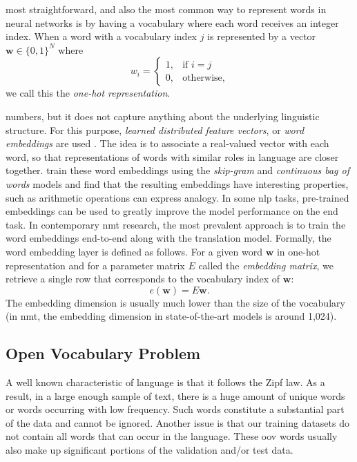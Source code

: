 most straightforward, and also the most common way to represent words in neural
networks is by having a vocabulary where each word receives an integer index.
When a word with a vocabulary index $j$ is represented by a vector $\mathbf{w}
\in \{0,1\}^N$ where
%
\begin{equation} w_i =
\begin{cases} 1, & \text{if } i = j \\ 0, & \text{otherwise,}
\end{cases}
\end{equation}
%
we call this the \emph{one-hot representation}.

numbers, but it does not capture anything about the underlying linguistic
structure.  For this purpose, \emph{learned distributed feature vectors}, or
\emph{word embeddings} are used \citep{bengio2003neural} . The idea is to associate a real-valued vector with each word, so that
representations of words with similar roles in language are closer
together. \citet{mikolov2013distributed} train these word embeddings using the
\emph{skip-gram} and \emph{continuous bag of words} models and find that the
resulting embeddings have interesting properties, such as arithmetic operations
can express analogy.  In some \gls{nlp} tasks, pre-trained embeddings can be
used to greatly improve the model performance on the end task. In contemporary
\gls{nmt} research, the most prevalent approach is to train the word embeddings
end-to-end along with the translation model.  %
 Formally, the word embedding layer is defined as follows. For a
given word $\textbf{w}$ in one-hot representation and for a parameter matrix $E$
called the \emph{embedding matrix}, we retrieve a single row that corresponds to
the vocabulary index of $\mathbf{w}$:
%
\begin{equation} e(\mathbf{w}) = E\mathbf{w}.
\end{equation}
%
The embedding dimension is usually much lower than the size of the vocabulary
(in \gls{nmt}, the embedding dimension in state-of-the-art models is around
1,024).


\subsection{Open Vocabulary Problem}

A well known characteristic of language is that it follows the Zipf law. As a
result, in a large enough sample of text, there is a huge amount of unique words
or words occurring with low frequency. Such words constitute a substantial part
of the data and cannot be ignored.  Another issue is that our training datasets
do not contain all words that can occur in the language. These \gls{oov} words
usually also make up significant portions of the validation and/or test data.

